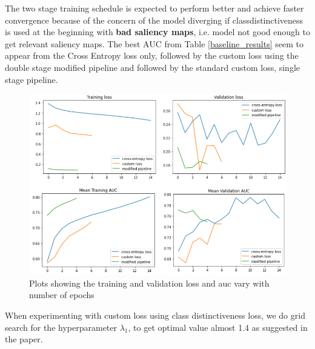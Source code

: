 The two stage training schedule is expected to perform better and achieve faster convergence because of the concern of the model diverging if classdistinctiveness is used at the beginning with \textbf{bad  saliency maps}, i.e. model not good enough to get relevant saliency maps.
The best AUC from Table \ref{baseline_results} seem to appear from the Cross Entropy loss only, followed by the custom loss using the double stage modified pipeline and followed by the standard custom loss, single stage pipeline.

\begin{figure}[!htbp]
  \begin{center}
    \leavevmode
    \ifpdf
      \includegraphics[scale=0.5]
      {Chapter3/Chapter3Figs/baseline_gs.png}    
    \fi
    \caption{Plots showing the training and validation loss and auc vary with number of epochs}
    \label{baseline_res}
  \end{center}
\end{figure}
When experimenting with custom loss using class distinctiveness loss, we do grid search for the hyperparameter $\lambda_1$, to get optimal value almost 1.4 as suggested in the paper.


